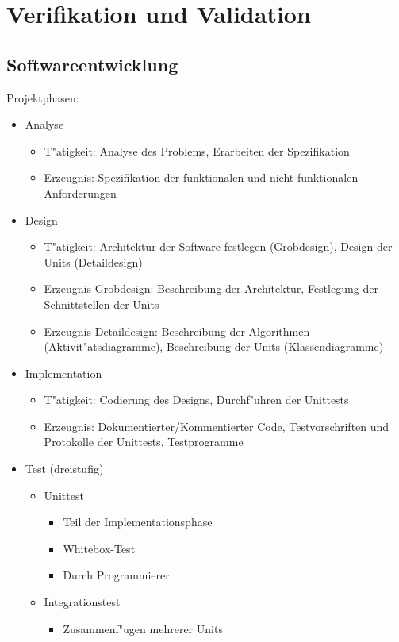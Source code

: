 \section{Verifikation und Validation}
\subsection{Softwareentwicklung}
Projektphasen:
\begin{itemize}
\item Analyse
	\begin{itemize}
		\item T"atigkeit: Analyse des Problems, Erarbeiten der Spezifikation
		\item Erzeugnis: Spezifikation der funktionalen und nicht funktionalen Anforderungen 
	\end{itemize}
\item Design 
		\begin{itemize}
			\item T"atigkeit: Architektur der Software festlegen (Grobdesign), Design der Units (Detaildesign)
			\item Erzeugnis Grobdesign: Beschreibung der Architektur, Festlegung der Schnittstellen der Units
			\item Erzeugnis Detaildesign: Beschreibung der Algorithmen (Aktivit"atsdiagramme), Beschreibung der Units (Klassendiagramme) 
		\end{itemize}
\item Implementation 
	\begin{itemize}
		\item T"atigkeit: Codierung des Designs, Durchf"uhren der Unittests
		\item Erzeugnis: Dokumentierter/Kommentierter Code, Testvorschriften und Protokolle der Unittests, Testprogramme  
	\end{itemize}
\item Test (dreistufig)
	\begin{itemize}
		\item Unittest
			\begin{itemize}
				\item Teil der Implementationsphase
				\item Whitebox-Test
				\item Durch Programmierer
			\end{itemize}
		\item Integrationstest
				\begin{itemize}
						\item Zusammenf"ugen mehrerer Units

\end{itemize}
\end{itemize}
\end{itemize}
